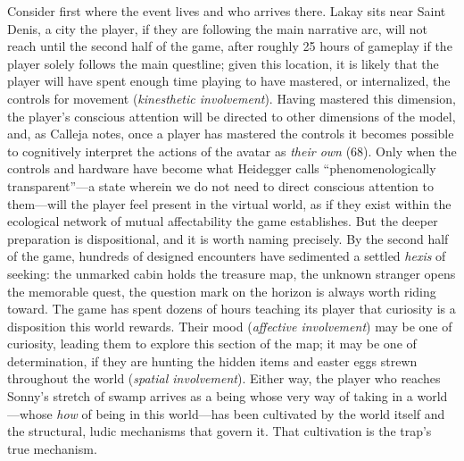 \documentclass{article}
\begin{document}
Consider first where the event lives and who arrives there. Lakay sits near Saint Denis, a city the player, if they are following the main narrative arc, will not reach until the second half of the game, after roughly 25 hours of gameplay if the player solely follows the main questline; given this location, it is likely that the player will have spent enough time playing to have mastered, or internalized, the controls for movement (\textit{kinesthetic involvement}). Having mastered this dimension, the player's conscious attention will be directed to other dimensions of the model, and, as Calleja notes, once a player has mastered the controls it becomes possible to cognitively interpret the actions of the avatar as \textit{their own} (68). Only when the controls and hardware have become what Heidegger calls ``phenomenologically transparent''---a state wherein we do not need to direct conscious attention to them---will the player feel present in the virtual world, as if they exist within the ecological network of mutual affectability the game establishes. But the deeper preparation is dispositional, and it is worth naming precisely. By the second half of the game, hundreds of designed encounters have sedimented a settled \textit{hexis} of seeking: the unmarked cabin holds the treasure map, the unknown stranger opens the memorable quest, the question mark on the horizon is always worth riding toward. The game has spent dozens of hours teaching its player that curiosity is a disposition this world rewards. Their mood (\textit{affective involvement}) may be one of curiosity, leading them to explore this section of the map; it may be one of determination, if they are hunting the hidden items and easter eggs strewn throughout the world (\textit{spatial involvement}). Either way, the player who reaches Sonny's stretch of swamp arrives as a being whose very way of taking in a world---whose \textit{how} of being in this world---has been cultivated by the world itself and the structural, ludic mechanisms that govern it. That cultivation is the trap's true mechanism.
\end{document}
